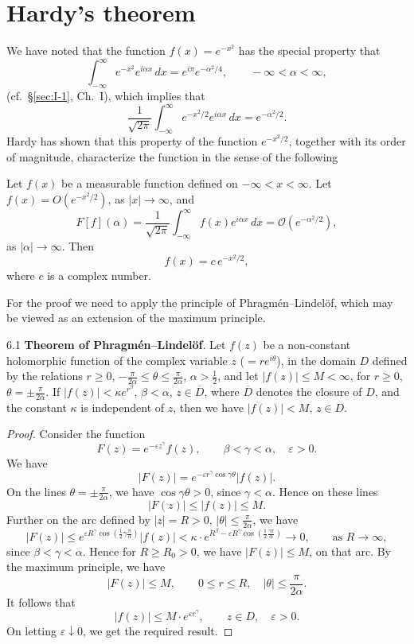 \setcounter{section}{5}
\section{Hardy's theorem}
\label{sec:II-6}

We have noted that the function $f(x)=e^{-x^{2}}$ has the special property that
\[
\int_{-\infty}^{\infty}e^{-x^{2}}e^{i\alpha x}\,dx=e^{i\pi}e^{-\alpha^{2}/4},\qquad-\infty<\alpha<\infty,
\]
(cf.\ \S\ref{sec:I-1}, Ch.~I), which implies that
\[
\frac{1}{\sqrt{2\pi}}\int_{-\infty}^{\infty}e^{-x^{2}/2}e^{i\alpha x}\,dx=e^{-\alpha^{2}/2}.
\]
Hardy has shown that this property of the function $e^{-x^{2}/2}$, together with its order of magnitude, characterize the function in the sense of the following

\begin{theorem}\label{thm:II-9}
Let $f(x)$ be a measurable function defined on $-\infty<x<\infty$. Let $f(x)=O(e^{-x^{2}/2})$, as $|x|\to\infty$, and
\[
F[f](\alpha)=\frac{1}{\sqrt{2\pi}}\int_{-\infty}^{\infty}f(x)e^{i\alpha x}\,dx
=\mathcal O(e^{-\alpha^{2}/2}),
\]
as $|\alpha|\to\infty$. Then
\[
f(x)=c\,e^{-x^{2}/2},
\]
where $c$ is a complex number.
\end{theorem}

For the proof we need to apply the principle of Phragm\'en--Lindel\"of, which may be viewed as an extension of the maximum principle.

\begin{nstmt}{6.1}\label{eq:II-6.1}
\textbf{Theorem of Phragm\'en--Lindel\"of}. Let $f(z)$ be a non-constant holomorphic function of the complex variable $z$ ($=re^{i\theta}$), in the domain $D$ defined by the relations $r\ge 0$, $-\frac{\pi}{2\alpha}\le\theta\le\frac{\pi}{2\alpha}$, $\alpha>\frac{1}{2}$, and let $|f(z)|\le M<\infty$, for $r\ge 0$, $\theta=\pm\frac{\pi}{2\alpha}$. If $|f(z)|<\kappa e^{r^{\beta}}$, $\beta<\alpha$, $z\in\overline{D}$, where $\overline{D}$ denotes the closure of $D$, and the constant $\kappa$ is independent of $z$, then we have $|f(z)|<M$, $z\in D$.
\end{nstmt}
\begin{proof}
Consider the function
\[
F(z)=e^{-\varepsilon z^{\gamma}}f(z),\qquad \beta<\gamma<\alpha,\quad \varepsilon>0.
\]
We have
\[
|F(z)|=e^{-\varepsilon r^{\gamma}\cos\gamma\theta}|f(z)|.
\]
On the lines $\theta=\pm\frac{\pi}{2\alpha}$, we have $\cos\gamma\theta>0$, since $\gamma<\alpha$. Hence on these lines
\[
|F(z)|\le |f(z)|\le M.
\]
Further on the arc defined by $|z|=R>0$, $|\theta|\le\frac{\pi}{2\alpha}$, we have
\[
|F(z)|\le e^{\varepsilon R^{\gamma}\cos(\frac{1}{2}\gamma\frac{\pi}{\alpha})}|f(z)|
<\kappa\cdot e^{R^{\beta}-\varepsilon R^{\gamma}\cos(\frac{1}{2}\frac{\gamma\pi}{\alpha})}\to 0,\qquad\text{as }R\to\infty,
\]
since $\beta<\gamma<\alpha$. Hence for $R\ge R_{0}>0$, we have $|F(z)|\le M$, on that arc. By the maximum principle, we have
\[
|F(z)|\le M,\qquad 0\le r\le R,\quad |\theta|\le\frac{\pi}{2\alpha}.
\]
It follows that
\[
|f(z)|\le M\cdot e^{\varepsilon r^{\gamma}},\qquad z\in D,\quad \varepsilon>0.
\]
On letting $\varepsilon\downarrow 0$, we get the required result.
\end{proof}

